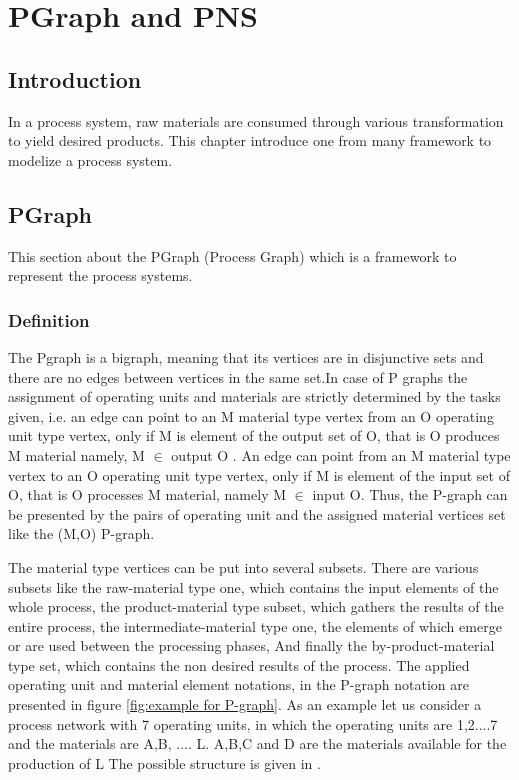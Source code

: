 
\chapter{\label{cha:pgraph}PGraph and PNS}

 
\section{Introduction}

In a process system, raw materials are consumed through various transformation to yield desired products. This chapter introduce one from many framework to modelize a process system.

\section{PGraph}
This section about the PGraph (Process Graph) which is a framework to represent the process systems. 

\subsection{Definition}

The Pgraph is a bigraph, meaning that its vertices are in disjunctive sets 
and there are no edges between vertices in the same set.In case of P graphs the assignment of operating units and materials are strictly determined by the tasks given, i.e. an edge can point to an M material type vertex 
from an O operating unit type vertex, only if M is element of the output set of O, 
that is O produces M material namely, M $\in$ output O \cite{pns2}. 
An edge can point from an M material type vertex to an O operating unit type vertex, 
only if M is element of the input set of O, that is O processes M material, namely M $\in$ input O. Thus, the P-graph can be presented by the pairs of operating unit and the assigned material vertices set like the (M,O) P-graph\cite{pns2}.

The material type vertices can be put into several subsets. There are various subsets like the raw-material type one, which contains the input elements of the whole process, the product-material type subset, which gathers the results of the entire process, the intermediate-material type one, the elements of which emerge or are used between the processing phases\cite{pns2}, And finally the by-product-material type set, which contains the non desired results of the process. The applied operating unit and material element notations, in the P-graph notation are presented in figure \ref{fig:example for P-graph}. As an example let us consider a process network with 7 operating units, 
in which the operating units are 1,2....7 and the materials are A,B, .... L. A,B,C and D 
are the materials available for the production of L The possible structure is given in \cite{pns2, pns4}. 
 


